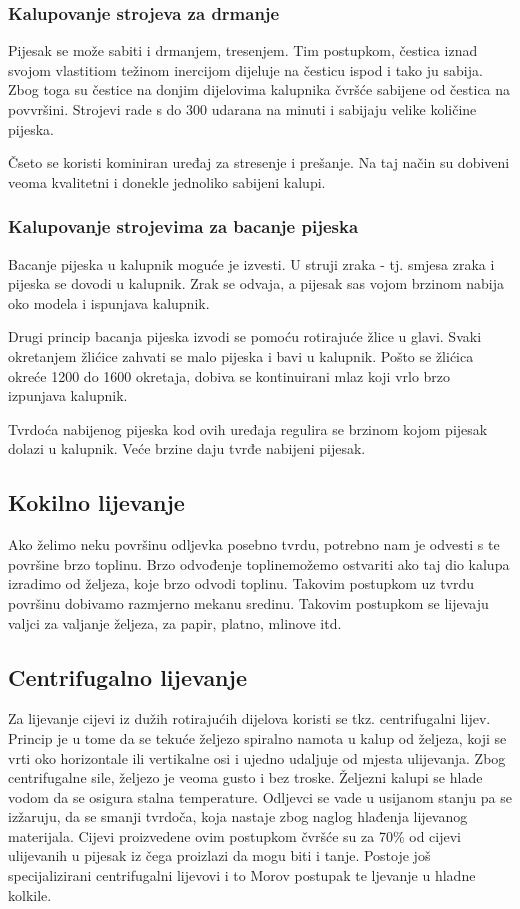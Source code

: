 \documentclass[a4paper,12pt]{article}
\numberwithin{figure}{section}
\begin{document}
\subsubsection{Kalupovanje strojeva za drmanje}
Pijesak se može sabiti i drmanjem, tresenjem. Tim postupkom, čestica iznad svojom vlastitiom težinom inercijom dijeluje na česticu ispod i tako ju sabija. Zbog toga su čestice na donjim dijelovima kalupnika čvršće sabijene od čestica na povvršini. Strojevi rade s do 300 udarana na minuti i sabijaju velike količine pijeska. \par
Čseto se koristi kominiran uređaj za stresenje i prešanje. Na taj način su dobiveni veoma kvalitetni i donekle jednoliko sabijeni kalupi.
\subsubsection{Kalupovanje strojevima za bacanje pijeska}
Bacanje pijeska u kalupnik moguće je izvesti. U struji zraka - tj. smjesa zraka i pijeska se dovodi u kalupnik. Zrak se odvaja, a pijesak sas vojom brzinom nabija oko modela i ispunjava kalupnik.\par
Drugi princip bacanja pijeska izvodi se pomoću rotirajuće žlice u glavi. Svaki okretanjem žlićice zahvati se malo pijeska i bavi u kalupnik. Pošto se žlićica okreće 1200 do 1600 okretaja, dobiva  se kontinuirani mlaz koji vrlo brzo izpunjava kalupnik.\par
Tvrdoća nabijenog pijeska kod ovih uređaja regulira se brzinom kojom pijesak dolazi u kalupnik. Veće brzine daju tvrđe nabijeni pijesak.
\subsection{Kokilno lijevanje}
Ako želimo neku površinu odljevka posebno tvrdu, potrebno nam je odvesti s te površine brzo toplinu. Brzo odvođenje toplinemožemo ostvariti ako taj dio kalupa izradimo od željeza, koje brzo odvodi toplinu. Takovim postupkom uz tvrdu površinu dobivamo razmjerno mekanu sredinu. Takovim postupkom se lijevaju valjci za valjanje željeza, za papir, platno, mlinove itd.
\subsection{Centrifugalno lijevanje}
Za lijevanje cijevi iz dužih rotirajućih dijelova koristi se tkz. centrifugalni lijev. Princip je u tome da se tekuće željezo spiralno namota u kalup od željeza, koji se vrti oko horizontale ili vertikalne osi i ujedno udaljuje od mjesta ulijevanja. Zbog centrifugalne sile, željezo je veoma gusto i bez troske. Željezni kalupi se hlade vodom da se osigura stalna temperature. Odljevci se vade u usijanom stanju pa se izžaruju, da se smanji tvrdoča, koja nastaje zbog naglog hlađenja lijevanog materijala. Cijevi proizvedene ovim postupkom čvršće su za 70$\%$ od cijevi ulijevanih u pijesak iz čega proizlazi da mogu biti i tanje. Postoje još specijalizirani centrifugalni lijevovi i to Morov postupak te ljevanje u hladne kolkile.
\end{document}
